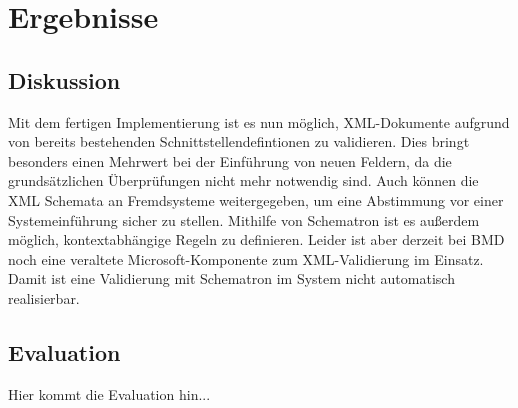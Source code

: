 \chapter{Ergebnisse}
\label{cha:Ergebnisse}

\section{Diskussion}
Mit dem fertigen Implementierung ist es nun möglich, XML-Dokumente aufgrund von bereits bestehenden Schnittstellendefintionen zu validieren. Dies bringt besonders einen Mehrwert bei der Einführung von neuen Feldern, da die grundsätzlichen Überprüfungen nicht mehr notwendig sind. 
Auch können die XML Schemata an Fremdsysteme weitergegeben, um eine Abstimmung vor einer Systemeinführung sicher zu stellen.
Mithilfe von Schematron ist es außerdem möglich, kontextabhängige Regeln zu definieren. Leider ist aber derzeit bei BMD noch eine veraltete Microsoft-Komponente zum XML-Validierung im Einsatz. Damit ist eine Validierung mit Schematron im System nicht automatisch realisierbar.


\section{Evaluation}
Hier kommt die Evaluation hin...